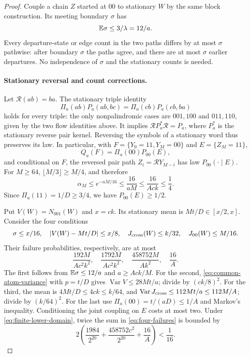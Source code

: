 \begin{proof}
Couple a chain $Z$ started at $00$ to stationary $W$ by the same block
construction. Its meeting boundary $\sigma$ has
\[
 \mathbb E\sigma\le3/\lambda=12/a.
\]
Every departure-state or edge count in the two paths differs by at most
$\sigma$ pathwise: after boundary $\sigma$ the paths agree, and there
are at most $\sigma$ earlier departures. No independence of $\sigma$
and the stationary counts is needed.

\paragraph{Stationary reversal and count corrections.}
Let $\mathcal R(ab)=ba$. The stationary triple identity
\[
 \Pi_a(ab)P_a(ab,bc)=\Pi_a(cb)P_a(cb,ba)
\]
holds for every triple: the only nonpalindromic cases are $001,100$
and $011,110$, given by the two flow identities above. It implies
$\mathcal R P_a^*\mathcal R=P_a$, where $P_a^*$ is the stationary
reverse pair kernel. Reversing the symbols of a stationary word thus
preserves its law. In particular, with
$F=\{Y_0=11,Y_M=00\}$ and $E=\{Z_M=11\}$,
\[
 Q_a(F)=\Pi_a(00)P_{00}(E),
\]
and conditional on $F$, the reversed pair path
$Z_i=\mathcal RY_{M-i}$ has law $P_{00}(\cdot\mid E)$.
For $M\ge64$, $\lfloor M/3\rfloor\ge M/4$, and therefore
\[
 \alpha_M\le e^{-aM/16}\le\frac{16}{aM}
 \le\frac{16}{Ack}\le\frac14.
\]
Since $\Pi_a(11)=1/D\ge3/4$, we have $P_{00}(E)\ge1/2$.

Put $V(W)=N_{001}(W)$ and $x=ck$. Its stationary mean is
$Mt/D\in[x/2,x]$. Consider the four conditions
\begin{equation}
 \sigma\le x/16,\quad |V(W)-Mt/D|\le x/8,\quad
 J_{\rm cross}(W)\le k/32,\quad J_{00}(W)\le M/16.
 \label{eq:preliminary-good}
\end{equation}
Their failure probabilities, respectively, are at most
\begin{equation}
 \frac{192M}{Ac^2k^2},\quad
 \frac{1792M}{Ac^2k^2},\quad
 \frac{458752M}{Ak^2},\quad \frac{16}{A}.
 \label{eq:four-failures}
\end{equation}
The first follows from $\mathbb E\sigma\le12/a$ and $a\ge Ack/M$.
For the second, \eqref{eq:common-atom-variance} with $p=t/D$ gives
$\operatorname{Var}V\le28Mt/a$; divide by $(ck/8)^2$.
For the third, the mean is $4Mt/D\le4ck\le k/64$, and
$\operatorname{Var}J_{\rm cross}\le112Mt/a\le112M/A$;
divide by $(k/64)^2$. For the last use
$\Pi_a(00)=t/(aD)\le1/A$ and Markov's inequality.
Conditioning the joint coupling on $E$ costs at most two. Under
\eqref{eq:finite-lower-domain}, twice the sum in
\eqref{eq:four-failures} is bounded by
\[
 2\left(\frac{1984}{2^{20}}
       +\frac{458752c^2}{2^{20}}+\frac{16}{A}\right)<\frac1{16}.
\]


\end{proof}
